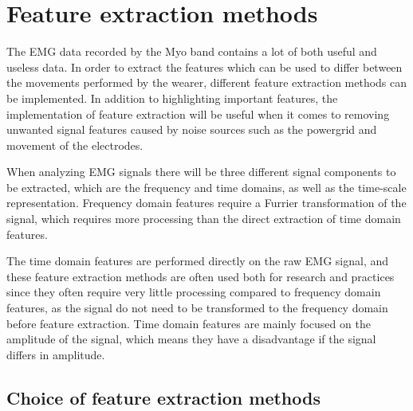 \section{Feature extraction methods}


The EMG data recorded by the Myo band contains a lot of both useful and useless data. In order to extract the features which can be used to differ between the movements performed by the wearer, different feature extraction methods can be implemented. In addition to highlighting important features, the implementation of feature extraction will be useful when it comes to removing unwanted signal features caused by noise sources such as the powergrid and movement of the electrodes. \cite{phiny2012}

When analyzing EMG signals there will be three different signal components to be extracted, which are the frequency and time domains, as well as the time-scale representation. Frequency domain features require a Furrier transformation of the signal, which requires more processing than the direct extraction of time domain features. \cite{phiny2012}

The time domain features are performed directly on the raw EMG signal, and these feature extraction methods are often used both for research and practices since they often require very little processing compared to frequency domain features, as the signal do not need to be transformed to the frequency domain before feature extraction. Time domain features are mainly focused on the amplitude of the signal, which means they have a disadvantage if the signal differs in amplitude. \cite{phiny2012}

\subsection{Choice of feature extraction methods}

